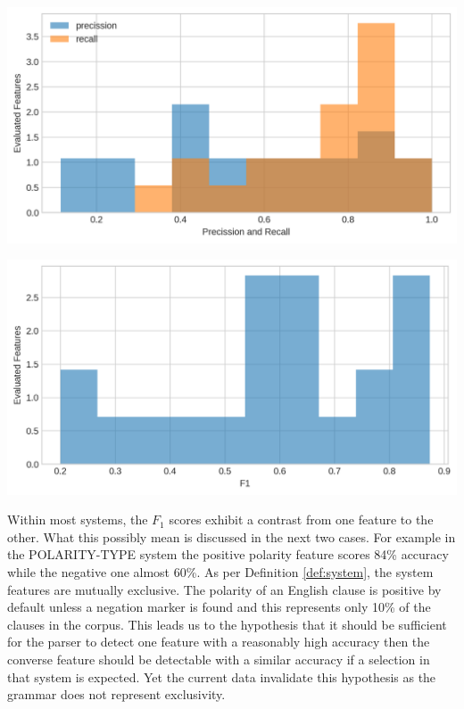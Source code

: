     \vspace{1em}
    \noindent
    \begin{minipage}[b]{0.49\textwidth}
        \centering
        \includegraphics[width=\textwidth]{evaluation-results/figures-old/accuracy-syntactic-mood-precission-recall.png}
        \label{fig:mood-precission-recall}
    \end{minipage}
    \quad
    \begin{minipage}[b]{0.49\textwidth}
        \centering
        \includegraphics[width=\textwidth]{evaluation-results/figures-old/accuracy-syntactic-mood-f1.png}
        \label{fig:mood-precission-f1}
    \end{minipage}
    \vspace{.5em}
    
    Within most systems, the $F_1$ scores exhibit a contrast from one feature to the other. What this possibly mean is discussed in the next two cases. For example in the POLARITY-TYPE system the positive polarity feature scores 84\% accuracy while the negative one almost 60\%. As per Definition \ref{def:system}, the system features are mutually exclusive. The polarity of an English clause is positive by default unless a negation marker is found and this represents only 10\% of the clauses in  the corpus. This leads us to the hypothesis that it should be sufficient for the parser to detect one feature with a reasonably high accuracy then the converse feature should be detectable with a similar accuracy if a selection in that system is expected. Yet the current data invalidate this hypothesis as the grammar does not represent exclusivity.
    
